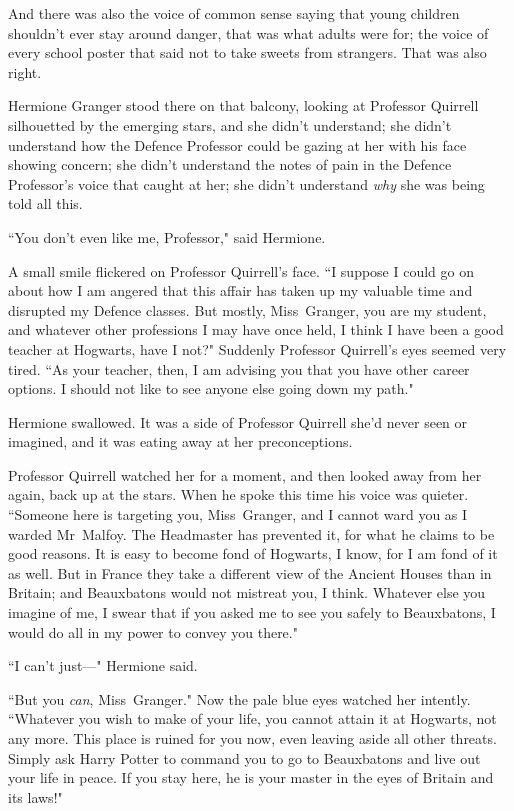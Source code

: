 And there was also the voice of common sense saying that young children shouldn't ever stay around danger, that was what adults were for; the voice of every school poster that said not to take sweets from strangers. That was also right.

Hermione Granger stood there on that balcony, looking at Professor Quirrell silhouetted by the emerging stars, and she didn't understand; she didn't understand how the Defence Professor could be gazing at her with his face showing concern; she didn't understand the notes of pain in the Defence Professor's voice that caught at her; she didn't understand \emph{why} she was being told all this.

``You don't even like me, Professor," said Hermione.

A small smile flickered on Professor Quirrell's face. ``I suppose I could go on about how I am angered that this affair has taken up my valuable time and disrupted my Defence classes. But mostly, Miss~Granger, you are my student, and whatever other professions I may have once held, I think I have been a good teacher at Hogwarts, have I not?" Suddenly Professor Quirrell's eyes seemed very tired. ``As your teacher, then, I am advising you that you have other career options. I should not like to see anyone else going down my path."

Hermione swallowed. It was a side of Professor Quirrell she'd never seen or imagined, and it was eating away at her preconceptions.

Professor Quirrell watched her for a moment, and then looked away from her again, back up at the stars. When he spoke this time his voice was quieter. ``Someone here is targeting you, Miss~Granger, and I cannot ward you as I warded Mr~Malfoy. The Headmaster has prevented it, for what he claims to be good reasons. It is easy to become fond of Hogwarts, I know, for I am fond of it as well. But in France they take a different view of the Ancient Houses than in Britain; and Beauxbatons would not mistreat you, I think. Whatever else you imagine of me, I swear that if you asked me to see you safely to Beauxbatons, I would do all in my power to convey you there."

``I can't just—" Hermione said.

``But you \emph{can}, Miss~Granger." Now the pale blue eyes watched her intently. ``Whatever you wish to make of your life, you cannot attain it at Hogwarts, not any more. This place is ruined for you now, even leaving aside all other threats. Simply ask Harry Potter to command you to go to Beauxbatons and live out your life in peace. If you stay here, he is your master in the eyes of Britain and its laws!"

